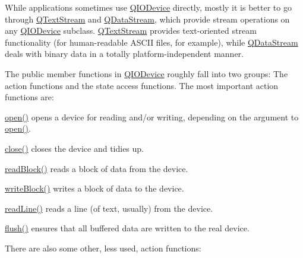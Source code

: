 While applications sometimes use \hyperlink{class_q_i_o_device}{Q\-I\-O\-Device} directly, mostly it is better to go through \hyperlink{class_q_text_stream}{Q\-Text\-Stream} and \hyperlink{class_q_data_stream}{Q\-Data\-Stream}, which provide stream operations on any \hyperlink{class_q_i_o_device}{Q\-I\-O\-Device} subclass. \hyperlink{class_q_text_stream}{Q\-Text\-Stream} provides text-\/oriented stream functionality (for human-\/readable A\-S\-C\-I\-I files, for example), while \hyperlink{class_q_data_stream}{Q\-Data\-Stream} deals with binary data in a totally platform-\/independent manner.

The public member functions in \hyperlink{class_q_i_o_device}{Q\-I\-O\-Device} roughly fall into two groups\-: The action functions and the state access functions. The most important action functions are\-: 
\begin{DoxyItemize}
\item \hyperlink{class_q_i_o_device_ab12465ab61dfc4e6de94a9b039d00759}{open()} opens a device for reading and/or writing, depending on the argument to \hyperlink{class_q_i_o_device_ab12465ab61dfc4e6de94a9b039d00759}{open()}.


\item \hyperlink{class_q_i_o_device_a99e62b97d3c24562d2dd84c47fab6b06}{close()} closes the device and tidies up.


\item \hyperlink{class_q_i_o_device_ac0c97a10369456c0942192a14f11c188}{read\-Block()} reads a block of data from the device.


\item \hyperlink{class_q_i_o_device_a90a5a6111eca9a444970cf49aea9f9a8}{write\-Block()} writes a block of data to the device.


\item \hyperlink{class_q_i_o_device_aa360b2281966b05ff25504cf03046c90}{read\-Line()} reads a line (of text, usually) from the device.


\item \hyperlink{class_q_i_o_device_a4d70e7cca08ae728d486c63f4804e63b}{flush()} ensures that all buffered data are written to the real device.


\end{DoxyItemize}There are also some other, less used, action functions\-: 
